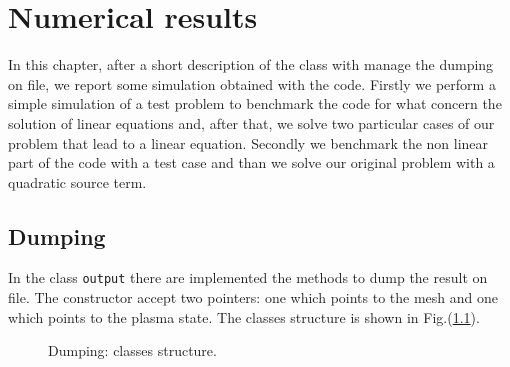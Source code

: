 \chapter{Numerical results}\label{ch:numerical_results}
In this chapter, after a short description of the class with manage the dumping on file, we report some simulation obtained with the code. Firstly we perform a simple simulation of a test problem to benchmark the code for what concern the solution of linear equations and, after that, we solve two particular cases of our problem that lead to a linear equation. Secondly we benchmark the non linear part of the code with a test case and than we solve our original problem with a quadratic source term.

\section{Dumping}\label{se:dump}
In the class \verb|output| there are implemented the methods to dump the result on file. The constructor accept two pointers: one which points to the mesh and one which points to the plasma state. The classes structure is shown in Fig.(\ref{fig:output_diagram}).
\begin{figure}
\centering
{}
\caption{Dumping: classes structure.}\label{fig:output_diagram}
\end{figure}

